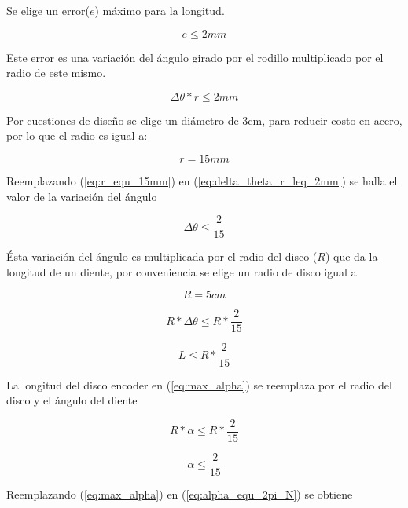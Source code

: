 \documentclass[main_conf.tex]{subfiles}
\begin{document}
Se elige un error($e$) máximo para la longitud.

\begin{equation}
e \leq 2 mm
\end{equation}

Este error es una variación del ángulo girado por el rodillo
multiplicado por el radio de este mismo.

\begin{equation}
\label{eq:delta_theta_r_leq_2mm}
\Delta  \theta *r \leq 2mm
\end{equation}

Por cuestiones de diseño se elige un diámetro de 3cm, para reducir
costo en acero, por lo que el radio es igual a:

\begin{equation}
\label{eq:r_equ_15mm}
r=15mm
\end{equation}

Reemplazando (\ref{eq:r_equ_15mm}) en
(\ref{eq:delta_theta_r_leq_2mm}) se halla el
valor de la variación del ángulo

\begin{equation}
\Delta  \theta\leq\frac{2}{15}
\end{equation}

Ésta variación del ángulo es multiplicada por el radio del disco
($R$) que da la longitud de un diente, por conveniencia se
elige un radio de disco igual a

\begin{equation}
R=5cm
\end{equation}

\begin{equation}
R*\Delta\theta\leq R*\frac{2}{15}
\end{equation}

\begin{equation}
\label{eq:max_L}
L\leq R*\frac{2}{15}
\end{equation}

La longitud del disco encoder en (\ref{eq:max_alpha}) se reemplaza
por el radio del disco y el ángulo del diente

\begin{equation}
R*\alpha\leq R*\frac{2}{15}
\end{equation}

\begin{equation}
\label{eq:max_alpha}
\alpha\leq \frac{2}{15}
\end{equation}

Reemplazando (\ref{eq:max_alpha}) en (\ref{eq:alpha_equ_2pi_N}) se
obtiene
\end{document}
